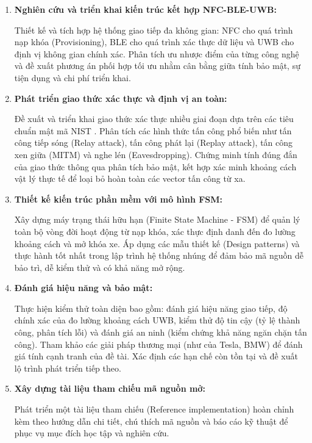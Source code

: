 \begin{enumerate}
    \item \textbf{Nghiên cứu và triển khai kiến trúc kết hợp NFC-BLE-UWB:}
    
    Thiết kế và tích hợp hệ thống giao tiếp đa không gian: NFC cho quá trình nạp khóa (Provisioning), BLE cho quá trình xác thực dữ liệu và UWB cho định vị không gian chính xác. Phân tích ưu nhược điểm của từng công nghệ và đề xuất phương án phối hợp tối ưu nhằm cân bằng giữa tính bảo mật, sự tiện dụng và chi phí triển khai.
    
    \item \textbf{Phát triển giao thức xác thực và định vị an toàn:}
    
    Đề xuất và triển khai giao thức xác thực nhiều giai đoạn dựa trên các tiêu chuẩn mật mã NIST \cite{nist_ecdh, fips186}. Phân tích các hình thức tấn công phổ biến như tấn công tiếp sóng (Relay attack), tấn công phát lại (Replay attack), tấn công xen giữa (MITM) và nghe lén (Eavesdropping). Chứng minh tính đúng đắn của giao thức thông qua phân tích bảo mật, kết hợp xác minh khoảng cách vật lý thực tế để loại bỏ hoàn toàn các vector tấn công từ xa.
    
    \item \textbf{Thiết kế kiến trúc phần mềm với mô hình FSM:}
    
    Xây dựng máy trạng thái hữu hạn (Finite State Machine - FSM) để quản lý toàn bộ vòng đời hoạt động từ nạp khóa, xác thực định danh đến đo lường khoảng cách và mở khóa xe. Áp dụng các mẫu thiết kế (Design patterns) và thực hành tốt nhất trong lập trình hệ thống nhúng để đảm bảo mã nguồn dễ bảo trì, dễ kiểm thử và có khả năng mở rộng.
    
    \item \textbf{Đánh giá hiệu năng và bảo mật:}
    
    Thực hiện kiểm thử toàn diện bao gồm: đánh giá hiệu năng giao tiếp, độ chính xác của đo lường khoảng cách UWB, kiểm thử độ tin cậy (tỷ lệ thành công, phân tích lỗi) và đánh giá an ninh (kiểm chứng khả năng ngăn chặn tấn công). Tham khảo các giải pháp thương mại (như của Tesla, BMW) để đánh giá tính cạnh tranh của đề tài. Xác định các hạn chế còn tồn tại và đề xuất lộ trình phát triển tiếp theo.
    
    \item \textbf{Xây dựng tài liệu tham chiếu mã nguồn mở:}
    
    Phát triển một tài liệu tham chiếu (Reference implementation) hoàn chỉnh kèm theo hướng dẫn chi tiết, chú thích mã nguồn và báo cáo kỹ thuật để phục vụ mục đích học tập và nghiên cứu.
\end{enumerate}

